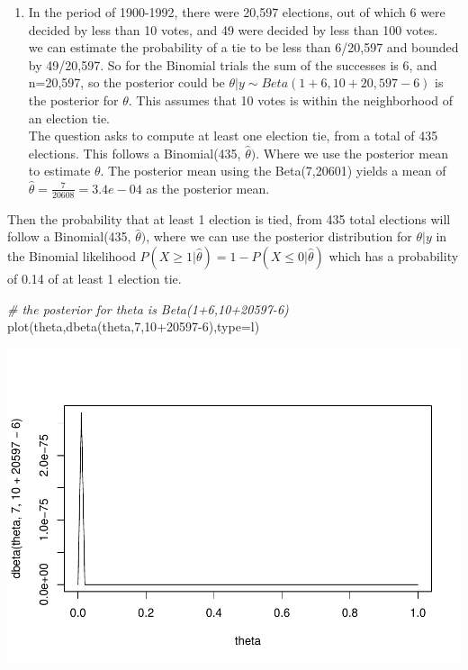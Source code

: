 \documentclass[
]{book}
\newenvironment{Shaded}{\begin{snugshade}}{\end{snugshade}}
\newcommand{\AttributeTok}[1]{\textcolor[rgb]{0.77,0.63,0.00}{#1}}
\newcommand{\CommentTok}[1]{\textcolor[rgb]{0.56,0.35,0.01}{\textit{#1}}}
\newcommand{\DecValTok}[1]{\textcolor[rgb]{0.00,0.00,0.81}{#1}}
\newcommand{\FunctionTok}[1]{\textcolor[rgb]{0.00,0.00,0.00}{#1}}
\newcommand{\NormalTok}[1]{#1}
\newcommand{\SpecialCharTok}[1]{\textcolor[rgb]{0.00,0.00,0.00}{#1}}
\newcommand{\StringTok}[1]{\textcolor[rgb]{0.31,0.60,0.02}{#1}}
\providecommand{\tightlist}{%
  \setlength{\itemsep}{0pt}\setlength{\parskip}{0pt}}
\theoremstyle{definition}
\theoremstyle{definition}
\theoremstyle{definition}
\theoremstyle{definition}
\theoremstyle{remark}
\begin{document}
\begin{enumerate}
\def\labelenumi{(\alph{enumi})}
\setcounter{enumi}{1}
\tightlist
\item
  In the period of 1900-1992, there were 20,597 elections, out of which 6 were decided by less than 10 votes, and 49 were decided by less than 100 votes.\\
  we can estimate the probability of a tie to be less than 6/20,597 and bounded by 49/20,597. So for the Binomial trials the sum of the successes is 6, and n=20,597, so the posterior could be \(\theta | y \sim Beta(1+6, 10+20,597 -6)\) is the posterior for \(\theta\). This assumes that 10 votes is within the neighborhood of an election tie.\\
  The question asks to compute at least one election tie, from a total of 435 elections. This follows a Binomial(435, \(\hat{\theta})\). Where we use the posterior mean to estimate \(\theta\). The posterior mean using the Beta(7,20601) yields a mean of \(\hat{\theta}=\frac{7}{20608} = 3.4e-04\) as the posterior mean.
\end{enumerate}

Then the probability that at least 1 election is tied, from 435 total elections will follow a Binomial(435, \(\hat{\theta})\), where we can use the posterior distribution for \(\theta | y\) in the Binomial likelihood \(P(X\geq 1 | \hat{\theta})= 1-P(X\leq0 | \hat{\theta})\) which has a probability of 0.14 of at least 1 election tie.

\begin{Shaded}
\begin{Highlighting}[]
 \CommentTok{\# the posterior for theta is Beta(1+6,10+20597{-}6)}
 \FunctionTok{plot}\NormalTok{(theta,}\FunctionTok{dbeta}\NormalTok{(theta,}\DecValTok{7}\NormalTok{,}\DecValTok{10}\SpecialCharTok{+}\DecValTok{20597{-}6}\NormalTok{),}\AttributeTok{type=}\StringTok{\textquotesingle{}l\textquotesingle{}}\NormalTok{)}
\end{Highlighting}
\end{Shaded}

\includegraphics{_main_files/figure-latex/unnamed-chunk-7-1.pdf}
\end{document}
